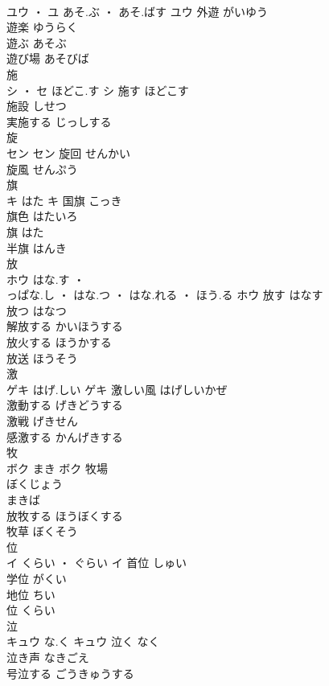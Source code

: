 \documentclass[8pt]{extreport}
\begin{document}
\begin{CJK}{UTF8}{min}
\\	ユウ ・ ユ	あそ.ぶ ・ あそ.ばす	ユウ	外遊	がいゆう	
\\	遊楽	ゆうらく	
\\	遊ぶ	あそぶ	
\\	遊び場	あそびば	
\\	施	
\\	シ ・ セ	ほどこ.す	シ	施す	ほどこす	
\\	施設	しせつ	
\\	実施する	じっしする	
\\	旋	
\\	セン		セン	旋回	せんかい	
\\	旋風	せんぷう	
\\	旗	
\\	キ	はた	キ	国旗	こっき	
\\	旗色	はたいろ	
\\	旗	はた	
\\	半旗	はんき	
\\	放	
\\	ホウ	はな.す ・ 
\\	っぱな.し ・ はな.つ ・ はな.れる ・ ほう.る	ホウ	放す	はなす	
\\	放つ	はなつ	
\\	解放する	かいほうする	
\\	放火する	ほうかする	
\\	放送	ほうそう	
\\	激	
\\	ゲキ	はげ.しい	ゲキ	激しい風	はげしいかぜ	
\\	激動する	げきどうする	
\\	激戦	げきせん	
\\	感激する	かんげきする	
\\	牧	
\\	ボク	まき	ボク	牧場 
\\	ぼくじょう 
\\	まきば	
\\	放牧する	ほうぼくする	
\\	牧草	ぼくそう	
\\	位	
\\	イ	くらい ・ ぐらい	イ	首位	しゅい	
\\	学位	がくい	
\\	地位	ちい	
\\	位	くらい	
\\	泣	
\\	キュウ	な.く	キュウ													泣く	なく	
\\	泣き声	なきごえ	
\\	号泣する	ごうきゅうする	

\end{CJK}
\end{document}
